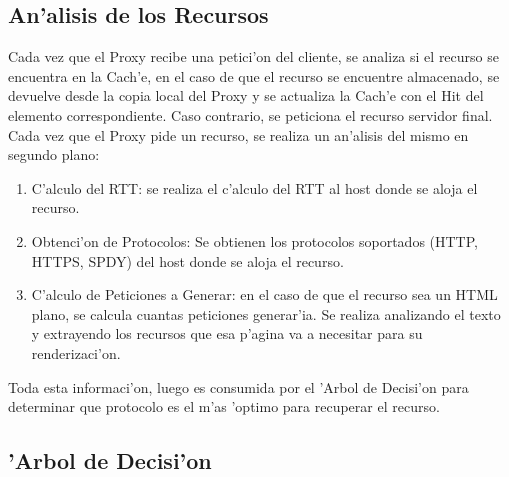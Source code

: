 \subsection{An'alisis de los Recursos}
\label{analisisRecurso}
Cada vez que el Proxy recibe una petici'on del cliente, se analiza si el recurso se encuentra en la Cach'e, en el caso de que el recurso se encuentre almacenado, se devuelve desde la copia local del Proxy y se actualiza la Cach'e con el Hit del elemento correspondiente. Caso contrario, se peticiona el recurso servidor final.
Cada vez que el Proxy pide un recurso, se realiza un an'alisis del mismo en segundo plano:
\begin{enumerate}
\item C'alculo del RTT: se realiza el c'alculo del RTT al host donde se aloja el recurso.
\item Obtenci'on de Protocolos: Se obtienen los protocolos soportados (HTTP, HTTPS, SPDY) del host donde se aloja el recurso.
\item C'alculo de Peticiones a Generar: en el caso de que el recurso sea un HTML plano, se calcula cuantas peticiones generar'ia. Se realiza analizando el texto y extrayendo los recursos que esa p'agina va a necesitar para su renderizaci'on.
\end{enumerate}
Toda esta informaci'on, luego es consumida por el 'Arbol de Decisi'on para determinar que protocolo es el m'as 'optimo para recuperar el recurso.

\subsection{'Arbol de Decisi'on}